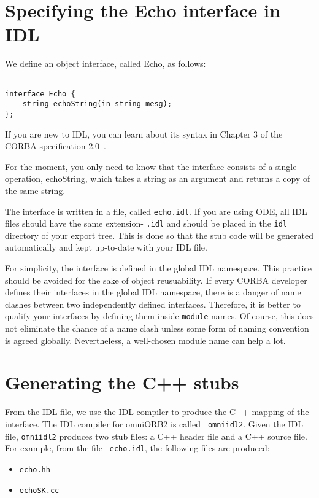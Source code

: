 \documentclass[11pt,twoside,onecolumn]{book}
\begin{document}
\section{Specifying the Echo interface in IDL}

We define an object interface, called Echo, as follows:

{\small
\begin{verbatim}

interface Echo {
    string echoString(in string mesg);
};

\end{verbatim}
}

If you are new to IDL, you can learn about its syntax in Chapter 3 of the
CORBA specification 2.0~\cite{corba2-spec}.

For the moment, you only need to know that the interface consists of a
single operation, echoString, which takes a string as an argument and
returns a copy of the same string.

The interface is written in a file, called {\tt echo.idl}. If you are
using ODE, all IDL files should have the same
extension- {\tt.idl} and should be placed in the {\tt idl} directory of
your export tree. This is done so that the stub code will be generated
automatically and kept up-to-date with your IDL file.

For simplicity, the interface is defined in the global IDL namespace. This
practice should be avoided for the sake of object reusuability. If every
CORBA developer defines their interfaces in the global IDL namespace, there
is a danger of name clashes between two independently defined
interfaces. Therefore, it is better to qualify your interfaces by defining
them inside {\tt module} names. Of course, this does not eliminate the
chance of a name clash unless some form of naming convention is agreed
globally. Nevertheless, a well-chosen module name can help a lot.

\section{Generating the C++ stubs}

From the IDL file, we use the IDL compiler to produce the C++ mapping of
the interface. The IDL compiler for omniORB2 is called {\tt
omniidl2}. Given the IDL file, {\tt omniidl2} produces two stub files: a
C++ header file and a C++ source file. For example, from the file {\tt
echo.idl}, the following files are produced:

\begin{itemize}
\item {\tt echo.hh}
\item {\tt echoSK.cc}
\end{itemize}
\end{document}
